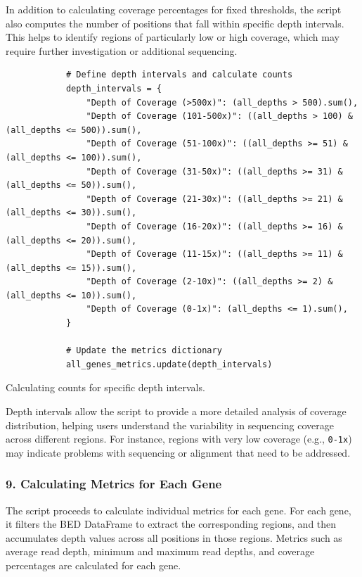 In addition to calculating coverage percentages for fixed thresholds, the script also computes the number of positions that fall within specific depth intervals. This helps to identify regions of particularly low or high coverage, which may require further investigation or additional sequencing.

\begin{longlisting}
\begin{verbatim}
            # Define depth intervals and calculate counts
            depth_intervals = {
                "Depth of Coverage (>500x)": (all_depths > 500).sum(),
                "Depth of Coverage (101-500x)": ((all_depths > 100) & (all_depths <= 500)).sum(),
                "Depth of Coverage (51-100x)": ((all_depths >= 51) & (all_depths <= 100)).sum(),
                "Depth of Coverage (31-50x)": ((all_depths >= 31) & (all_depths <= 50)).sum(),
                "Depth of Coverage (21-30x)": ((all_depths >= 21) & (all_depths <= 30)).sum(),
                "Depth of Coverage (16-20x)": ((all_depths >= 16) & (all_depths <= 20)).sum(),
                "Depth of Coverage (11-15x)": ((all_depths >= 11) & (all_depths <= 15)).sum(),
                "Depth of Coverage (2-10x)": ((all_depths >= 2) & (all_depths <= 10)).sum(),
                "Depth of Coverage (0-1x)": (all_depths <= 1).sum(),
            }

            # Update the metrics dictionary
            all_genes_metrics.update(depth_intervals)
\end{verbatim}
\caption{Calculating counts for specific depth intervals.}
\label{lbl:metrics_intervals}
\end{longlisting}

Depth intervals allow the script to provide a more detailed analysis of coverage distribution, helping users understand the variability in sequencing coverage across different regions. For instance, regions with very low coverage (e.g., \texttt{0-1x}) may indicate problems with sequencing or alignment that need to be addressed.

\subsubsection{9. Calculating Metrics for Each Gene}

The script proceeds to calculate individual metrics for each gene. For each gene, it filters the BED DataFrame to extract the corresponding regions, and then accumulates depth values across all positions in those regions. Metrics such as average read depth, minimum and maximum read depths, and coverage percentages are calculated for each gene.

